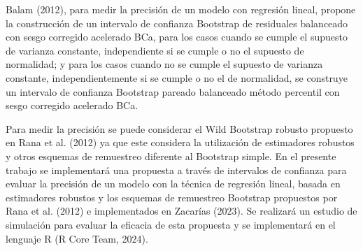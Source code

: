 Balam (2012), para medir la precisión de un modelo con regresión lineal, propone la construcción de un intervalo de confianza Bootstrap de residuales balanceado con sesgo corregido acelerado BCa, para los casos cuando se cumple el supuesto de varianza constante, independiente si se cumple o no el supuesto de normalidad; y para los casos cuando no se cumple el supuesto de varianza constante, independientemente si se cumple o no el de normalidad, se construye un intervalo de confianza Bootstrap pareado balanceado método percentil con sesgo corregido acelerado BCa.
\vspace{.5cm}

Para medir la precisión se puede considerar el Wild Bootstrap robusto propuesto en Rana et al. (2012) ya que este considera la utilización de estimadores robustos y otros esquemas de remuestreo diferente al Bootstrap simple.
En el presente trabajo se implementará una propuesta a través de intervalos de confianza para evaluar la precisión de un modelo con la técnica de regresión lineal, basada en estimadores robustos y los esquemas de remuestreo Bootstrap propuestos por Rana et al. (2012) e implementados en Zacarías (2023). Se realizará un estudio de simulación para evaluar la eficacia de esta propuesta y se implementará en el lenguaje R (R Core Team, 2024).
